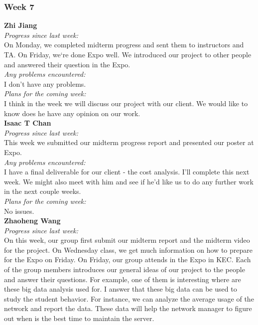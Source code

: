 \subsubsection{Week 7}
\textbf{Zhi Jiang}\\
\noindent\textit{Progress since last week:}\\
On Monday, we completed midterm progress and sent them to instructors and TA. On Friday, we‘re done Expo well. We introduced our project to other people and answered their question in the Expo.\\

\noindent\textit{Any problems encountered:}\\
I don't have any problems.\\

\noindent\textit{Plans for the coming week:}\\
I think in the week we will discuss our project with our client. We would like to know does he have any opinion on our work.\\

\noindent\textbf{Isaac T Chan}\\
\noindent\textit{Progress since last week:}\\
This week we submitted our midterm progress report and presented our poster at Expo.\\

\noindent\textit{Any problems encountered:}\\
I have a final deliverable for our client - the cost analysis. I'll complete this next week. We might also meet with him and see if he'd like us to do any further work in the next couple weeks.\\

\noindent\textit{Plans for the coming week:}\\
No issues.\\

\noindent\textbf{Zhaoheng Wang}\\
\noindent\textit{Progress since last week:}\\
On this week, our group first submit our midterm report and the midterm video for the project. On Wednesday class, we get much information on how to prepare for the Expo on Friday. On Friday, our group attends in the Expo in KEC. Each of the group members introduces our general ideas of our project to the people and answer their questions. For example, one of them is interesting where are these big data analysis used for. I answer that these big data can be used to study the student behavior. For instance, we can analyze the average usage of the network and report the data. These data will help the network manager to figure out when is the best time to maintain the server.\\

